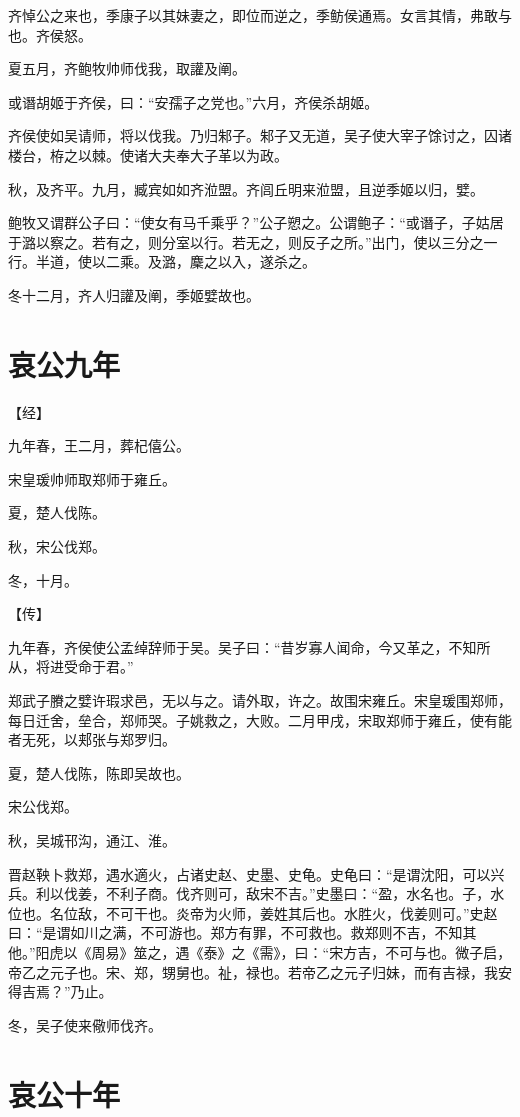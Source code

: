 \documentclass[a4paper,12pt,UTF8,twoside]{ctexbook}
\begin{document}
齐悼公之来也，季康子以其妹妻之，即位而逆之，季鲂侯通焉。女言其情，弗敢与也。齐侯怒。

夏五月，齐鲍牧帅师伐我，取讙及阐。

或谮胡姬于齐侯，曰：“安孺子之党也。”六月，齐侯杀胡姬。

齐侯使如吴请师，将以伐我。乃归邾子。邾子又无道，吴子使大宰子馀讨之，囚诸楼台，栫之以棘。使诸大夫奉大子革以为政。

秋，及齐平。九月，臧宾如如齐涖盟。齐闾丘明来涖盟，且逆季姬以归，嬖。

鲍牧又谓群公子曰：“使女有马千乘乎？”公子愬之。公谓鲍子：“或谮子，子姑居于潞以察之。若有之，则分室以行。若无之，则反子之所。”出门，使以三分之一行。半道，使以二乘。及潞，麇之以入，遂杀之。

冬十二月，齐人归讙及阐，季姬嬖故也。


\chapter{哀公九年}


【经】

九年春，王二月，葬杞僖公。

宋皇瑗帅师取郑师于雍丘。

夏，楚人伐陈。

秋，宋公伐郑。

冬，十月。

【传】

九年春，齐侯使公孟绰辞师于吴。吴子曰：“昔岁寡人闻命，今又革之，不知所从，将进受命于君。”

郑武子賸之嬖许瑕求邑，无以与之。请外取，许之。故围宋雍丘。宋皇瑗围郑师，每日迁舍，垒合，郑师哭。子姚救之，大败。二月甲戌，宋取郑师于雍丘，使有能者无死，以郏张与郑罗归。

夏，楚人伐陈，陈即吴故也。

宋公伐郑。

秋，吴城邗沟，通江、淮。

晋赵鞅卜救郑，遇水適火，占诸史赵、史墨、史龟。史龟曰：“是谓沈阳，可以兴兵。利以伐姜，不利子商。伐齐则可，敌宋不吉。”史墨曰：“盈，水名也。子，水位也。名位敌，不可干也。炎帝为火师，姜姓其后也。水胜火，伐姜则可。”史赵曰：“是谓如川之满，不可游也。郑方有罪，不可救也。救郑则不吉，不知其他。”阳虎以《周易》筮之，遇《泰》之《需》，曰：“宋方吉，不可与也。微子启，帝乙之元子也。宋、郑，甥舅也。祉，禄也。若帝乙之元子归妹，而有吉禄，我安得吉焉？”乃止。

冬，吴子使来儆师伐齐。


\chapter{哀公十年}
\end{document}
